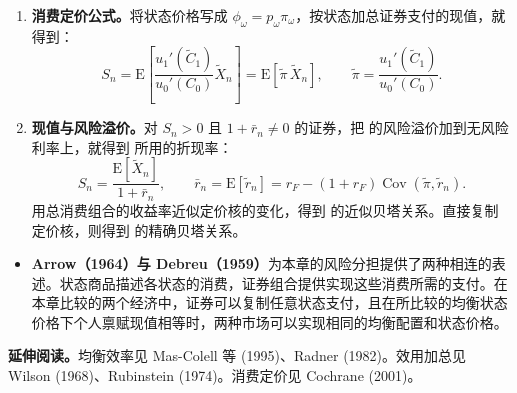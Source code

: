 \begin{tcolorbox}[summary,title=从完全市场到消费定价]
\begin{enumerate}
 \item \textbf{消费定价公式。}将状态价格写成 $\phi_\omega=p_\omega\pi_\omega$，按状态加总证券支付的现值，就得到：
 \[
 S_n=\mathrm E\!\left[\frac{u_1'(\widetilde C_1)}{u_0'(C_0)}
 \widetilde X_n\right]=\mathrm E[\widetilde\pi\,\widetilde X_n],
 \qquad \widetilde\pi=\frac{u_1'(\widetilde C_1)}{u_0'(C_0)}.
 \]
 \item \textbf{现值与风险溢价。}对 $S_n>0$ 且 $1+\bar r_n\ne0$ 的证券，把 的风险溢价加到无风险利率上，就得到 所用的折现率：
 \[
 S_n=\frac{\mathrm E[\widetilde X_n]}{1+\bar r_n},
 \qquad \bar r_n=\mathrm E[\tilde r_n]
 =r_F-(1+r_F)\operatorname{Cov}(\widetilde\pi,\tilde r_n).
 \]
 用总消费组合的收益率近似定价核的变化，得到 的近似贝塔关系。直接复制定价核，则得到 的精确贝塔关系。
\end{enumerate}
\end{tcolorbox}

\begin{tcolorbox}[knowledge,breakable=false,title={参考文献与本章贡献}]
\begin{itemize}
 \item \textbf{Arrow（1964）与 Debreu（1959）}为本章的风险分担提供了两种相连的表述。状态商品描述各状态的消费，证券组合提供实现这些消费所需的支付。在本章比较的两个经济中，证券可以复制任意状态支付，且在所比较的均衡状态价格下个人禀赋现值相等时，两种市场可以实现相同的均衡配置和状态价格。
\end{itemize}
\end{tcolorbox}

\textbf{延伸阅读。}均衡效率见 Mas-Colell 等 (1995)、Radner (1982)。效用加总见 Wilson (1968)、Rubinstein (1974)。消费定价见 Cochrane (2001)。
\fi

\WJChapterExercises

\endgroup
